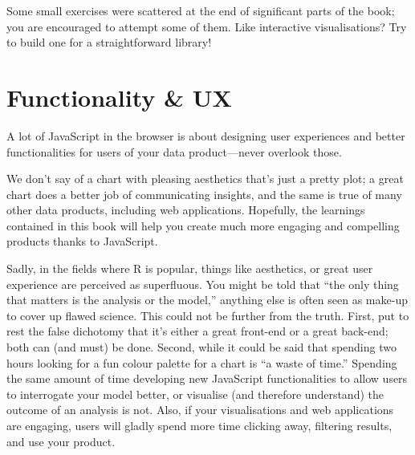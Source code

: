 \documentclass[
  10pt,
]{krantz}
\begin{document}
Some small exercises were scattered at the end of significant parts of the book; you are encouraged to attempt some of them. Like interactive visualisations? Try to build one for a straightforward library!

\hypertarget{conclusion-ux}{%
\section{Functionality \& UX}\label{conclusion-ux}}

A lot of JavaScript in the browser is about designing user experiences and better functionalities for users of your data product---never overlook those.

We don't say of a chart with pleasing aesthetics that's just a pretty plot; a great chart does a better job of communicating insights, and the same is true of many other data products, including web applications. Hopefully, the learnings contained in this book will help you create much more engaging and compelling products thanks to JavaScript.

Sadly, in the fields where R is popular, things like aesthetics, or great user experience are perceived as superfluous. You might be told that ``the only thing that matters is the analysis or the model,'' anything else is often seen as make-up to cover up flawed science. This could not be further from the truth. First, put to rest the false dichotomy that it's either a great front-end or a great back-end; both can (and must) be done. Second, while it could be said that spending two hours looking for a fun colour palette for a chart is ``a waste of time.'' Spending the same amount of time developing new JavaScript functionalities to allow users to interrogate your model better, or visualise (and therefore understand) the outcome of an analysis is not. Also, if your visualisations and web applications are engaging, users will gladly spend more time clicking away, filtering results, and use your product.

  

\backmatter
\printindex
\end{document}
